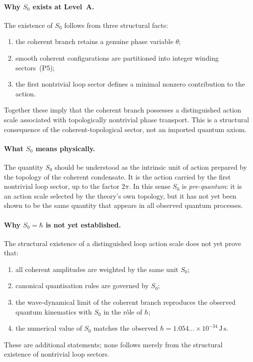 \paragraph{Why $S_0$ exists at Level~A.}
The existence of $S_0$ follows from three structural facts:
\begin{enumerate}[label=(\roman*)]
  \item the coherent branch retains a genuine phase variable $\theta$;
  \item smooth coherent configurations are partitioned into integer
    winding sectors~(P5);
  \item the first nontrivial loop sector defines a minimal nonzero
    contribution to the action.
\end{enumerate}
Together these imply that the coherent branch possesses a distinguished
action scale associated with topologically nontrivial phase transport.
This is a structural consequence of the coherent-topological sector,
not an imported quantum axiom.

\paragraph{What $S_0$ means physically.}
The quantity $S_0$ should be understood as the intrinsic unit of action
prepared by the topology of the coherent condensate.
It is the action carried by the first nontrivial loop sector, up to the
factor $2\pi$.
In this sense $S_0$ is \emph{pre-quantum}: it is an action scale
selected by the theory's own topology, but it has not yet been shown to
be the same quantity that appears in all observed quantum processes.

\paragraph{Why $S_0=\hbar$ is not yet established.}
The structural existence of a distinguished loop action scale does not
yet prove that:
\begin{enumerate}[label=(\roman*)]
  \item all coherent amplitudes are weighted by the same unit $S_0$;
  \item canonical quantisation rules are governed by $S_0$;
  \item the wave-dynamical limit of the coherent branch reproduces the
    observed quantum kinematics with $S_0$ in the r\^ole of $\hbar$;
  \item the numerical value of $S_0$ matches the observed
    $\hbar=1.054\ldots\times10^{-34}\,\mathrm{J\,s}$.
\end{enumerate}
These are additional statements; none follows merely from
the structural existence of nontrivial loop sectors.

